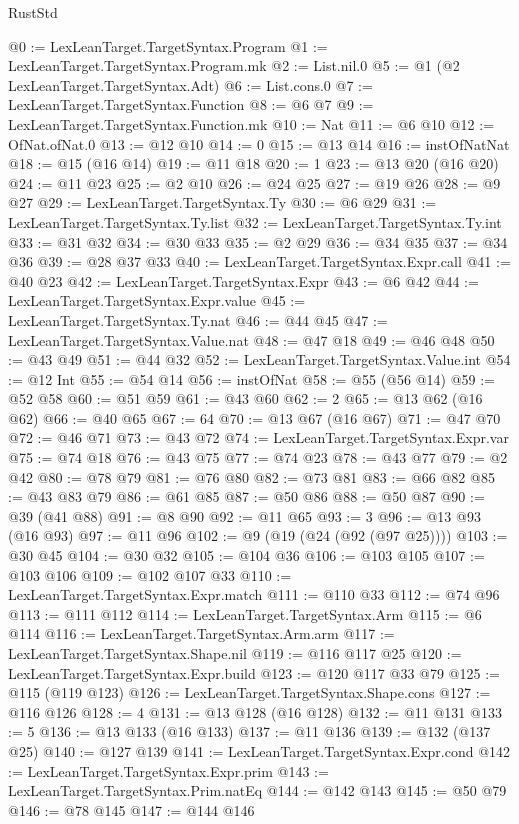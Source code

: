 \begin{lexlean}{RustStd}
\begin{coremodule}
{\begin{coremodule}
{{{{{{{{{{{@0 := LexLeanTarget.TargetSyntax.Program
@1 := LexLeanTarget.TargetSyntax.Program.mk
@2 := List.nil.{0}
@5 := @1 (@2 LexLeanTarget.TargetSyntax.Adt)
@6 := List.cons.{0}
@7 := LexLeanTarget.TargetSyntax.Function
@8 := @6 @7
@9 := LexLeanTarget.TargetSyntax.Function.mk
@10 := Nat
@11 := @6 @10
@12 := OfNat.ofNat.{0}
@13 := @12 @10
@14 := 0
@15 := @13 @14
@16 := instOfNatNat
@18 := @15 (@16 @14)
@19 := @11 @18
@20 := 1
@23 := @13 @20 (@16 @20)
@24 := @11 @23
@25 := @2 @10
@26 := @24 @25
@27 := @19 @26
@28 := @9 @27
@29 := LexLeanTarget.TargetSyntax.Ty
@30 := @6 @29
@31 := LexLeanTarget.TargetSyntax.Ty.list
@32 := LexLeanTarget.TargetSyntax.Ty.int
@33 := @31 @32
@34 := @30 @33
@35 := @2 @29
@36 := @34 @35
@37 := @34 @36
@39 := @28 @37 @33
@40 := LexLeanTarget.TargetSyntax.Expr.call
@41 := @40 @23
@42 := LexLeanTarget.TargetSyntax.Expr
@43 := @6 @42
@44 := LexLeanTarget.TargetSyntax.Expr.value
@45 := LexLeanTarget.TargetSyntax.Ty.nat
@46 := @44 @45
@47 := LexLeanTarget.TargetSyntax.Value.nat
@48 := @47 @18
@49 := @46 @48
@50 := @43 @49
@51 := @44 @32
@52 := LexLeanTarget.TargetSyntax.Value.int
@54 := @12 Int
@55 := @54 @14
@56 := instOfNat
@58 := @55 (@56 @14)
@59 := @52 @58
@60 := @51 @59
@61 := @43 @60
@62 := 2
@65 := @13 @62 (@16 @62)
@66 := @40 @65
@67 := 64
@70 := @13 @67 (@16 @67)
@71 := @47 @70
@72 := @46 @71
@73 := @43 @72
@74 := LexLeanTarget.TargetSyntax.Expr.var
@75 := @74 @18
@76 := @43 @75
@77 := @74 @23
@78 := @43 @77
@79 := @2 @42
@80 := @78 @79
@81 := @76 @80
@82 := @73 @81
@83 := @66 @82
@85 := @43 @83 @79
@86 := @61 @85
@87 := @50 @86
@88 := @50 @87
@90 := @39 (@41 @88)
@91 := @8 @90
@92 := @11 @65
@93 := 3
@96 := @13 @93 (@16 @93)
@97 := @11 @96
@102 := @9 (@19 (@24 (@92 (@97 @25))))
@103 := @30 @45
@104 := @30 @32
@105 := @104 @36
@106 := @103 @105
@107 := @103 @106
@109 := @102 @107 @33
@110 := LexLeanTarget.TargetSyntax.Expr.match
@111 := @110 @33
@112 := @74 @96
@113 := @111 @112
@114 := LexLeanTarget.TargetSyntax.Arm
@115 := @6 @114
@116 := LexLeanTarget.TargetSyntax.Arm.arm
@117 := LexLeanTarget.TargetSyntax.Shape.nil
@119 := @116 @117 @25
@120 := LexLeanTarget.TargetSyntax.Expr.build
@123 := @120 @117 @33 @79
@125 := @115 (@119 @123)
@126 := LexLeanTarget.TargetSyntax.Shape.cons
@127 := @116 @126
@128 := 4
@131 := @13 @128 (@16 @128)
@132 := @11 @131
@133 := 5
@136 := @13 @133 (@16 @133)
@137 := @11 @136
@139 := @132 (@137 @25)
@140 := @127 @139
@141 := LexLeanTarget.TargetSyntax.Expr.cond
@142 := LexLeanTarget.TargetSyntax.Expr.prim
@143 := LexLeanTarget.TargetSyntax.Prim.natEq
@144 := @142 @143
@145 := @50 @79
@146 := @78 @145
@147 := @144 @146
}}}}}}}}}}}
\end{coremodule}}
\end{coremodule}
\end{lexlean}
